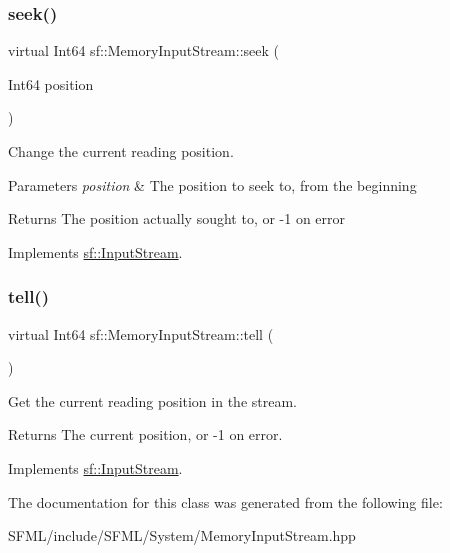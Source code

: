 \subsubsection{\texorpdfstring{seek()}{seek()}}
{\footnotesize\ttfamily virtual Int64 sf\+::\+Memory\+Input\+Stream\+::seek (\begin{DoxyParamCaption}\item[{Int64}]{position }\end{DoxyParamCaption})\hspace{0.3cm}{\ttfamily [virtual]}}



Change the current reading position. 


\begin{DoxyParams}{Parameters}
{\em position} & The position to seek to, from the beginning\\
\hline
\end{DoxyParams}
\begin{DoxyReturn}{Returns}
The position actually sought to, or -\/1 on error \begin{DoxyVerb}\end{DoxyVerb}
 
\end{DoxyReturn}


Implements \mbox{\hyperlink{classsf_1_1_input_stream_a76aba8e5d5cf9b1c5902d5e04f7864fc}{sf\+::\+Input\+Stream}}.

\mbox{\label{classsf_1_1_memory_input_stream_a7ad4bdf721f29de8f66421ff29e23ee4}} 
\subsubsection{\texorpdfstring{tell()}{tell()}}
{\footnotesize\ttfamily virtual Int64 sf\+::\+Memory\+Input\+Stream\+::tell (\begin{DoxyParamCaption}{ }\end{DoxyParamCaption})\hspace{0.3cm}{\ttfamily [virtual]}}



Get the current reading position in the stream. 

\begin{DoxyReturn}{Returns}
The current position, or -\/1 on error. \begin{DoxyVerb}\end{DoxyVerb}
 
\end{DoxyReturn}


Implements \mbox{\hyperlink{classsf_1_1_input_stream_a599515b9ccdbddb6fef5a98424fd559c}{sf\+::\+Input\+Stream}}.



The documentation for this class was generated from the following file\+:\begin{DoxyCompactItemize}
\item 
S\+F\+M\+L/include/\+S\+F\+M\+L/\+System/Memory\+Input\+Stream.\+hpp\end{DoxyCompactItemize}
